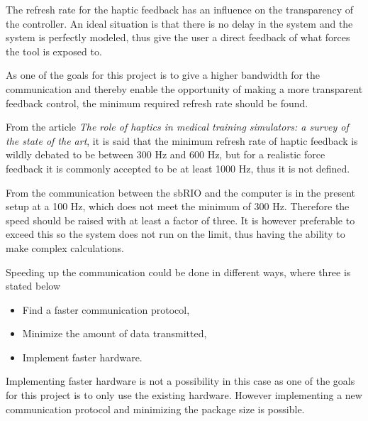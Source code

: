 
The refresh rate for the haptic feedback has an influence on the transparency of the controller. An ideal situation is that there is no delay in the system and the system is perfectly modeled, thus give the user a direct feedback of what forces the tool is exposed to. 

As one of the goals for this project is to give a higher bandwidth for the communication and thereby enable the opportunity of making a more transparent feedback control, the minimum required refresh rate should be found.

From the article \textit{The role of haptics in medical training simulators: a survey of the state of the art}\cite{coles2011role}, it is said that the minimum refresh rate of haptic feedback is wildly debated to be between 300 Hz and 600 Hz, but for a realistic force feedback it is commonly accepted to be at least 1000 Hz, thus it is not defined. 

From   the communication between the sbRIO and the computer is in the present setup at a 100 Hz, which does not meet the minimum of 300 Hz. Therefore the speed should be raised with at least a factor of three. It is however preferable to exceed this so the system does not run on the limit, thus having the ability to make complex calculations.

Speeding up the communication could be done in different ways, where three is stated below

\begin{itemize}
	\item Find a faster communication protocol,
	\item Minimize the amount of data transmitted,
	\item Implement faster hardware.	
\end{itemize}

Implementing faster hardware is not a possibility in this case as one of the goals for this project is to only use the existing hardware.
However implementing a new communication protocol and minimizing the package size is possible.
